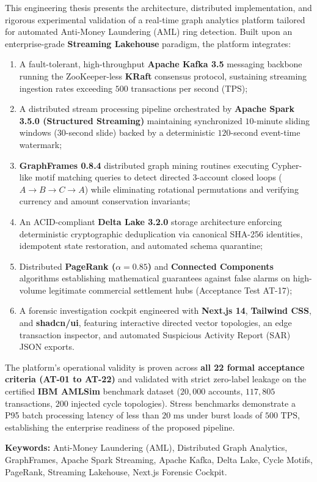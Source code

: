This engineering thesis presents the architecture, distributed implementation, and rigorous experimental validation of a real-time graph analytics platform tailored for automated Anti-Money Laundering (AML) ring detection. Built upon an enterprise-grade \textbf{Streaming Lakehouse} paradigm, the platform integrates:
\begin{enumerate}
    \item A fault-tolerant, high-throughput \textbf{Apache Kafka 3.5} messaging backbone running the ZooKeeper-less \textbf{KRaft} consensus protocol, sustaining streaming ingestion rates exceeding $500$ transactions per second (TPS);
    \item A distributed stream processing pipeline orchestrated by \textbf{Apache Spark 3.5.0 (Structured Streaming)} maintaining synchronized $10$-minute sliding windows ($30$-second slide) backed by a deterministic $120$-second event-time watermark;
    \item \textbf{GraphFrames 0.8.4} distributed graph mining routines executing Cypher-like motif matching queries to detect directed $3$-account closed loops ($A \to B \to C \to A$) while eliminating rotational permutations and verifying currency and amount conservation invariants;
    \item An ACID-compliant \textbf{Delta Lake 3.2.0} storage architecture enforcing deterministic cryptographic deduplication via canonical SHA-256 identities, idempotent state restoration, and automated schema quarantine;
    \item Distributed \textbf{PageRank ($\alpha=0.85$)} and \textbf{Connected Components} algorithms establishing mathematical guarantees against false alarms on high-volume legitimate commercial settlement hubs (Acceptance Test AT-17);
    \item A forensic investigation cockpit engineered with \textbf{Next.js 14}, \textbf{Tailwind CSS}, and \textbf{shadcn/ui}, featuring interactive directed vector topologies, an edge transaction inspector, and automated Suspicious Activity Report (SAR) JSON exports.
\end{enumerate}

The platform's operational validity is proven across \textbf{all 22 formal acceptance criteria (AT-01 to AT-22)} and validated with strict zero-label leakage on the certified \textbf{IBM AMLSim} benchmark dataset ($20,000$ accounts, $117,805$ transactions, $200$ injected cycle topologies). Stress benchmarks demonstrate a P95 batch processing latency of less than $20\text{ ms}$ under burst loads of $500\text{ TPS}$, establishing the enterprise readiness of the proposed pipeline.

\vspace{0.8cm}
\noindent\textbf{Keywords:} Anti-Money Laundering (AML), Distributed Graph Analytics, GraphFrames, Apache Spark Streaming, Apache Kafka, Delta Lake, Cycle Motifs, PageRank, Streaming Lakehouse, Next.js Forensic Cockpit.
